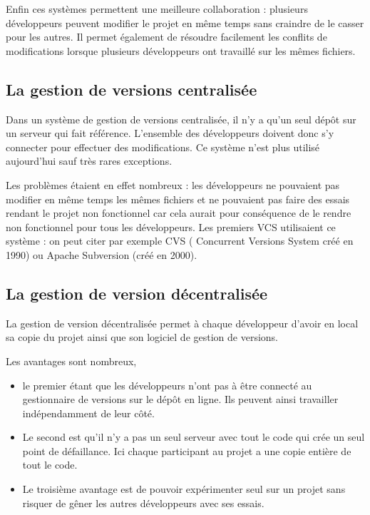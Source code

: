 \documentclass{article}
\begin{document}
Enfin ces systèmes permettent une meilleure collaboration : plusieurs développeurs peuvent modifier le projet en même temps sans craindre de le casser pour les autres. Il permet également de résoudre facilement les conflits de modifications lorsque plusieurs développeurs ont travaillé sur les mêmes fichiers.

\subsection{La gestion de versions centralisée}
Dans un système de gestion de versions centralisée, il n'y a qu'un seul dépôt sur un serveur qui fait référence. L'ensemble des développeurs doivent donc s'y connecter pour effectuer des modifications. Ce système n'est plus utilisé aujourd'hui sauf très rares exceptions.

Les problèmes étaient en effet nombreux : les développeurs ne pouvaient pas modifier en même temps les mêmes fichiers et ne pouvaient pas faire des essais rendant le projet non fonctionnel car cela aurait pour conséquence de le rendre non fonctionnel pour tous les développeurs. Les premiers VCS utilisaient ce système : on peut citer par exemple {\color{blue} CVS} ({\color{blue} Concurrent Versions System créé en 1990}) ou {\color{blue} Apache Subversion} (créé en 2000).

\subsection{La gestion de version décentralisée}
La gestion de version décentralisée permet à chaque développeur d'avoir en local sa copie du projet ainsi que son logiciel de gestion de versions.

Les avantages sont nombreux, 
\begin{itemize}
\item le premier étant que les développeurs n'ont pas à être connecté au gestionnaire de versions sur le dépôt en ligne. Ils peuvent ainsi travailler indépendamment de leur côté.

\item Le second est qu'il n'y a pas un seul serveur avec tout le code qui crée un seul point de défaillance. Ici chaque participant au projet a une copie entière de tout le code.

\item Le troisième avantage est de pouvoir expérimenter seul sur un projet sans risquer de gêner les autres développeurs avec ses essais.
\end{itemize}
\end{document}
